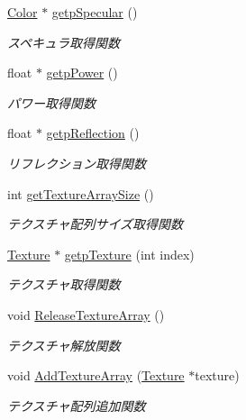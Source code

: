 \begin{DoxyCompactItemize}
\mbox{\hyperlink{class_md_bin_data_1_1_color}{Color}} $\ast$ \mbox{\hyperlink{class_md_bin_data_1_1_material_a3dd95902f709e30a346dbc095e0eb900}{getp\+Specular}} ()
\begin{DoxyCompactList}\small\item\em スペキュラ取得関数 \end{DoxyCompactList}\item 
float $\ast$ \mbox{\hyperlink{class_md_bin_data_1_1_material_a2fad1db40f8d9466ac87be3782149104}{getp\+Power}} ()
\begin{DoxyCompactList}\small\item\em パワー取得関数 \end{DoxyCompactList}\item 
float $\ast$ \mbox{\hyperlink{class_md_bin_data_1_1_material_aa060a0f3fa72b5cfeef427c5a529e259}{getp\+Reflection}} ()
\begin{DoxyCompactList}\small\item\em リフレクション取得関数 \end{DoxyCompactList}\item 
int \mbox{\hyperlink{class_md_bin_data_1_1_material_a9ac4c6f4a97143645a1b5c78d321ba71}{get\+Texture\+Array\+Size}} ()
\begin{DoxyCompactList}\small\item\em テクスチャ配列サイズ取得関数 \end{DoxyCompactList}\item 
\mbox{\hyperlink{class_md_bin_data_1_1_material_1_1_texture}{Texture}} $\ast$ \mbox{\hyperlink{class_md_bin_data_1_1_material_a51888aa2e18d1d191818cad0ee07f45d}{getp\+Texture}} (int index)
\begin{DoxyCompactList}\small\item\em テクスチャ取得関数 \end{DoxyCompactList}\item 
void \mbox{\hyperlink{class_md_bin_data_1_1_material_a052ceb2c797f8a24c89d988510e874ae}{Release\+Texture\+Array}} ()
\begin{DoxyCompactList}\small\item\em テクスチャ解放関数 \end{DoxyCompactList}\item 
void \mbox{\hyperlink{class_md_bin_data_1_1_material_a8d6a7d5c0f7f11d84a155846c467a580}{Add\+Texture\+Array}} (\mbox{\hyperlink{class_md_bin_data_1_1_material_1_1_texture}{Texture}} $\ast$texture)
\begin{DoxyCompactList}\small\item\em テクスチャ配列追加関数 \end{DoxyCompactList}\end{DoxyCompactItemize}
